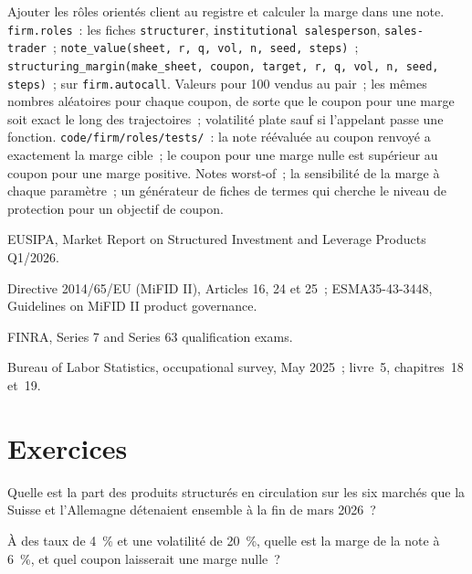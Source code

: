 \begin{build}
 Ajouter les rôles orientés client au registre et calculer la marge dans une note.
 \texttt{firm.roles}~: les fiches \texttt{structurer}, \texttt{institutional salesperson},
\texttt{sales-trader}~; \texttt{note\_value(sheet, r, q, vol, n, seed, steps)}~;
\texttt{structuring\_margin(make\_sheet, coupon, target, r, q, vol, n, seed, steps)}~; sur \texttt{firm.autocall}.
 Valeurs pour 100 vendus au pair~; les mêmes nombres aléatoires pour chaque coupon, de sorte que le coupon pour une marge soit
exact le long des trajectoires~; volatilité plate sauf si l'appelant passe une fonction.
 \texttt{code/firm/roles/tests/}~: la note réévaluée au coupon renvoyé a exactement la marge cible~;
le coupon pour une marge nulle est supérieur au coupon pour une marge positive.
 Notes worst-of~; la sensibilité de la marge à chaque paramètre~; un générateur de fiches de termes qui cherche le
niveau de protection pour un objectif de coupon.
\end{build}

\begin{omsources}
\item EUSIPA, Market Report on Structured Investment and Leverage Products Q1/2026.
\item Directive 2014/65/EU (MiFID II), Articles 16, 24 et 25~; ESMA35-43-3448, Guidelines on MiFID II product governance.
\item FINRA, Series 7 and Series 63 qualification exams.
\item Bureau of Labor Statistics, occupational survey, May 2025~; livre~5, chapitres~18 et~19.
\end{omsources}

\section{Exercices}

\begin{exercise}[$\star$]\label{exo:in:structurer-sales-and-sales-trader:1}
Quelle est la part des produits structurés en circulation sur les six marchés que la Suisse et
l'Allemagne détenaient ensemble à la fin de mars 2026~?
\end{exercise}

\begin{exercise}[$\star$]\label{exo:in:structurer-sales-and-sales-trader:2}
À des taux de 4~\% et une volatilité de 20~\%, quelle est la marge de la note à 6~\%, et quel coupon laisserait une marge nulle~?
\end{exercise}

